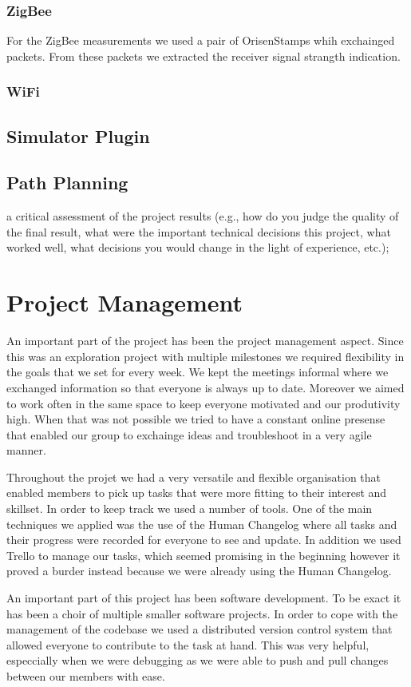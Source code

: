 \subsubsection{ZigBee}
For the ZigBee measurements we used a pair of OrisenStamps whih exchainged
packets. From these packets we extracted the receiver signal strangth
indication.
\subsubsection{WiFi}
\subsection{Simulator Plugin}
\subsection{Path Planning}
a critical assessment of the project results (e.g., how do you judge the
quality of the final result, what were the important technical decisions
this project, what worked well, what decisions you would change in the light
of experience, etc.);

\section{Project Management}
An important part of the project has been the project management aspect. Since
this was an exploration project with multiple milestones we required flexibility
in the goals that we set for every week. We kept the meetings informal where we
exchanged information so that everyone is always up to date. Moreover we aimed
to work often in the same space to keep everyone motivated and our produtivity
high. When that was not possible we tried to have a constant online presense
that enabled our group to exchainge ideas and troubleshoot in a very agile
manner.

Throughout the projet we had a very versatile and flexible organisation that
enabled members to pick up tasks that were more fitting to their interest and
skillset. In order to keep track we used a number of tools. One of the main
techniques we applied was the use of the Human Changelog where all tasks and
their progress were recorded for everyone to see and update. In addition we used
Trello to manage our tasks, which seemed promising in the beginning however it
proved a burder instead because we were already using the Human Changelog.

An important part of this project has been software development. To be exact it
has been a choir of multiple smaller software projects. In order to cope with
the management of the codebase we used a distributed version control system that
allowed everyone to contribute to the task at hand. This was very helpful,
especcially when we were debugging as we were able to push and pull changes
between our members with ease.


